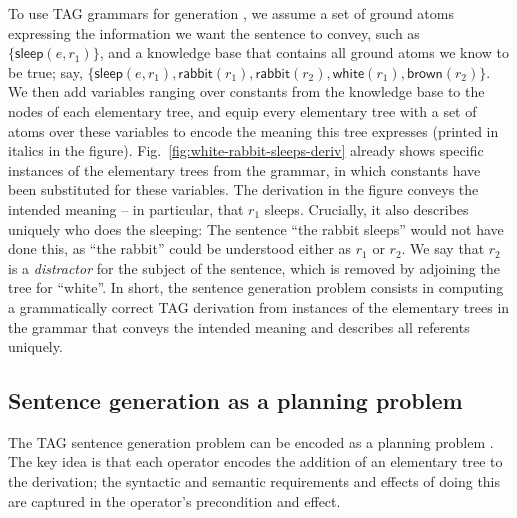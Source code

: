 To use TAG grammars for generation \cite{Stone2003a}, we assume a set
of ground atoms expressing the information we want the sentence to
convey, such as $\{\mathsf{sleep}(e,r_1)\}$, and a knowledge base that
contains all ground atoms we know to be true; say,
$\{\mathsf{sleep}(e,r_1), \mathsf{rabbit}(r_1), \mathsf{rabbit}(r_2),
\mathsf{white}(r_1), \mathsf{brown}(r_2)\}$.  We then add variables
ranging over constants from the knowledge base to the nodes of each
elementary tree, and equip every elementary tree with a set of atoms
over these variables to encode the meaning this tree expresses
(printed in italics in the figure).
Fig.~\ref{fig:white-rabbit-sleeps-deriv} already shows specific
instances of the elementary trees from the grammar, in which constants
have been substituted for these variables.  The derivation in the
figure conveys the intended meaning -- in particular, that $r_1$
sleeps.  Crucially, it also describes uniquely who does the sleeping:
The sentence ``the rabbit sleeps'' would not have done this, as ``the
rabbit'' could be understood either as $r_1$ or $r_2$.  We say that
$r_2$ is a \emph{distractor} for the subject of the sentence, which is
removed by adjoining the tree for ``white''.  In short, the sentence
generation problem consists in computing a grammatically correct TAG
derivation from instances of the elementary trees in the grammar that
conveys the intended meaning and describes all referents uniquely.




\subsection{Sentence generation as a planning problem}

The TAG sentence generation problem can be encoded as a planning
problem \cite{KolSto07}.  The key idea is that each operator encodes
the addition of an elementary tree to the derivation; the syntactic
and semantic requirements and effects of doing this are captured in
the operator's precondition and effect.


\newcommand{\action}[4]{\textbf{#1$(#2)$:}\\
\strut\quad   Precond:$\;$ \parbox[t]{12cm}{\ensuremath{#3}}\\
\strut\quad   Effect:$\;$ \parbox[t]{12cm}{\ensuremath{#4}}}
\newcommand{\f}[1]{\mathsf{#1}}

